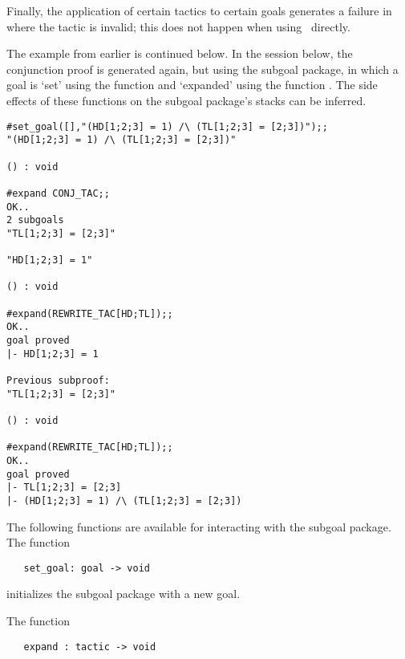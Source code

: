 Finally, the application of certain tactics to certain goals generates
a failure
in \ML\, where the tactic is invalid; this does not happen when
using \HOL\ directly.

The example from earlier is continued below.  In the session below,
the conjunction proof is generated again, but using the subgoal
package, in which a goal is `set' using the function 
and `expanded' using the function . The side effects of
these functions on the subgoal package's stacks can be inferred.


\begin{session}\begin{verbatim}
#set_goal([],"(HD[1;2;3] = 1) /\ (TL[1;2;3] = [2;3])");;
"(HD[1;2;3] = 1) /\ (TL[1;2;3] = [2;3])"

() : void

#expand CONJ_TAC;;
OK..
2 subgoals
"TL[1;2;3] = [2;3]"

"HD[1;2;3] = 1"

() : void

#expand(REWRITE_TAC[HD;TL]);;
OK..
goal proved
|- HD[1;2;3] = 1

Previous subproof:
"TL[1;2;3] = [2;3]"

() : void

#expand(REWRITE_TAC[HD;TL]);;
OK..
goal proved
|- TL[1;2;3] = [2;3]
|- (HD[1;2;3] = 1) /\ (TL[1;2;3] = [2;3])
\end{verbatim}\end{session}


The following functions
 are available for interacting
with the subgoal package. The function

\begin{boxed}\begin{verbatim}
   set_goal: goal -> void
\end{verbatim}\end{boxed}

\noindent initializes the subgoal package with a new goal.

The function

\begin{boxed}\begin{verbatim}
   expand : tactic -> void
\end{verbatim}\end{boxed}

